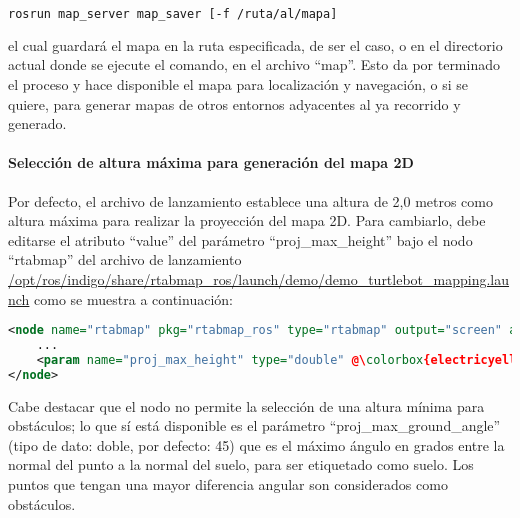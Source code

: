 \begin{blackcodebox}
\begin{lstlisting}[language=bash]
rosrun map_server map_saver [-f /ruta/al/mapa]
\end{lstlisting}
\end{blackcodebox}

el cual guardará el mapa en la ruta especificada, de ser el caso, o en el directorio actual donde se ejecute el comando, en el archivo ``map''. Esto da por terminado el proceso y hace disponible el mapa para localización y navegación, o si se quiere, para generar mapas de otros entornos adyacentes al ya recorrido y generado.

\paragraph{Selección de altura máxima para generación del mapa 2D}

Por defecto, el archivo de lanzamiento establece una altura de 2,0 metros como altura máxima para realizar la proyección del mapa 2D. Para cambiarlo, debe editarse el atributo ``value'' del parámetro ``proj\_max\_height'' bajo el nodo ``rtabmap'' del archivo de lanzamiento \url{/opt/ros/indigo/share/rtabmap_ros/launch/demo/demo_turtlebot_mapping.launch} como se muestra a continuación:

\begin{blackcodebox}
\begin{lstlisting}[escapechar=@, language=xml]
<node name="rtabmap" pkg="rtabmap_ros" type="rtabmap" output="screen" args="$(arg args)">
    ...
    <param name="proj_max_height" type="double" @\colorbox{electricyellow}{value=``2.0''}@ />
</node>
\end{lstlisting}
\end{blackcodebox}

Cabe destacar que el nodo no permite la selección de una altura mínima para obstáculos; lo que sí está disponible es el parámetro ``proj\_max\_ground\_angle'' (tipo de dato: doble, por defecto: 45) que es el máximo ángulo en grados entre la normal del punto a la normal del suelo, para ser etiquetado como suelo. Los puntos que tengan una mayor diferencia angular son considerados como obstáculos.